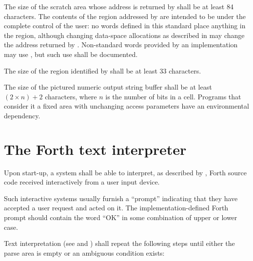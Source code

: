The size of the scratch area whose address is returned by 
shall be at least 84 characters. The contents of the region
addressed by  are intended to be under the complete
control of the user: no words defined in this standard place
anything in the region, although changing data-space allocations as
described in  may change
the address returned by . Non-standard words provided by
an implementation may use , but such use shall be
documented.

The size of the region identified by  shall be at least
33 characters.

The size of the pictured numeric output string buffer shall be at
least $(2 \times n) + 2 $ characters, where $n$ is the number of
bits in a cell. Programs that consider it a fixed area with
unchanging access parameters have an environmental dependency.


\section{The Forth text interpreter} %
\label{usage:command}

Upon start-up, a system shall be able to interpret, as described
by , Forth source code received interactively
from a user input device.

Such interactive systems usually furnish a ``prompt'' indicating
that they have accepted a user request and acted on it. The
implementation-defined Forth prompt should contain the word ``OK''
in some combination of upper or lower case.

Text interpretation (see  and
) shall repeat the following steps until
either the parse area is empty or an ambiguous condition exists:

